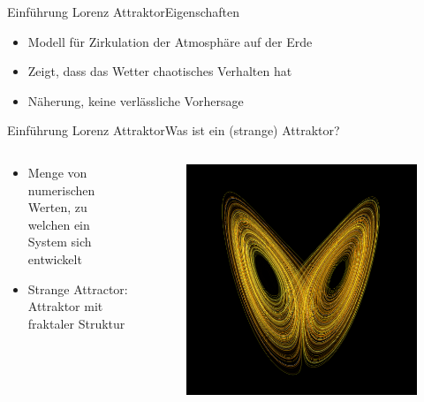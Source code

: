 \documentclass[presentation.tex]{subfiles}
\begin{document}
    \begin{frame}{Einführung Lorenz Attraktor}{Eigenschaften}
    	\begin{itemize}
    		\item Modell für Zirkulation der Atmosphäre auf der Erde
    		\item Zeigt, dass das Wetter chaotisches Verhalten hat
    		\item Näherung, keine verlässliche Vorhersage
    	\end{itemize}
    \end{frame}
    
    \begin{frame}{Einführung Lorenz Attraktor}{Was ist ein (strange) Attraktor?}
		
		\begin{columns}[c]
			\begin{column}{.6\textwidth}
				\begin{itemize}
					\item Menge von numerischen Werten, zu welchen ein System sich entwickelt
					\item Strange Attractor: Attraktor mit fraktaler Struktur
				\end{itemize}
			\end{column}
			\begin{column}{.4\textwidth}
				\begin{figure}
					\centering
					\includegraphics[width=1\linewidth]{Attractor}
					\label{fig:Attractor}
				\end{figure}
			\end{column}
		\end{columns}
    \end{frame}
    
\end{document}

